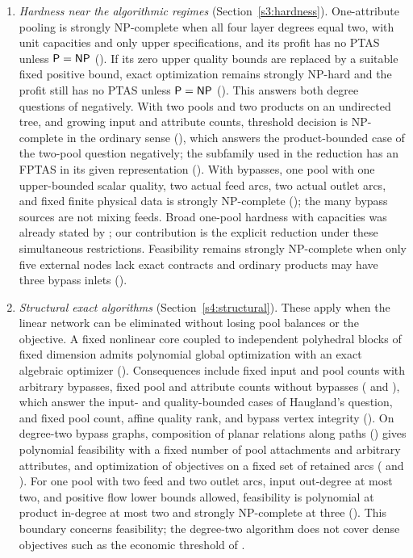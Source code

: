 \begin{enumerate}[label=(\arabic*),leftmargin=*]
\item \emph{Hardness near the algorithmic regimes}
(Section~\ref{s3:hardness}). One-attribute pooling is strongly
NP-complete when all four layer degrees equal two, with unit capacities
and only upper specifications, and its profit has no PTAS unless
$\mathsf P=\mathsf{NP}$ (). If its zero upper quality bounds are
replaced by a suitable fixed positive bound, exact optimization remains strongly
NP-hard and the profit still has no PTAS unless $\mathsf P=\mathsf{NP}$
(). This answers both degree questions
of \citet{s4:boland2017} negatively. With two pools and two products on
an undirected tree, and growing input and attribute counts, threshold
decision is NP-complete in the ordinary sense (),
which answers the product-bounded case of the two-pool question
negatively; the subfamily used in the reduction has an FPTAS in its
given representation (). With bypasses, one pool with one
upper-bounded scalar quality, two actual feed arcs, two actual outlet
arcs, and fixed finite physical data is strongly NP-complete
(); the many bypass sources are not mixing feeds.
Broad one-pool hardness with capacities was already stated by
\citet[Remark~4.6]{s3:baltean2018}; our contribution is the explicit
reduction under these simultaneous restrictions. Feasibility remains
strongly NP-complete when only five external nodes lack exact contracts
and ordinary products may have three bypass inlets ().

\item \emph{Structural exact algorithms} (Section~\ref{s4:structural}).
These apply when the linear network can be eliminated without losing
pool balances or the objective. A fixed nonlinear core coupled to
independent polyhedral blocks of fixed dimension admits polynomial
global optimization with an exact algebraic optimizer
(). Consequences include fixed input and pool counts
with arbitrary bypasses, fixed pool and attribute counts without
bypasses ( and ), which answer the
input- and quality-bounded cases of Haugland's question, and fixed pool
count, affine quality rank, and bypass vertex integrity
(). On degree-two bypass graphs, composition
of planar relations along paths () gives
polynomial feasibility with a fixed number of pool attachments and
arbitrary attributes, and optimization of objectives on a fixed set of
retained arcs ( and ).
For one pool with two feed and two outlet arcs, input out-degree at most
two, and positive flow lower bounds allowed, feasibility is polynomial at product in-degree at most two and strongly
NP-complete at three (). This boundary concerns
feasibility; the degree-two algorithm does not cover dense objectives
such as the economic threshold of .


\end{enumerate}
